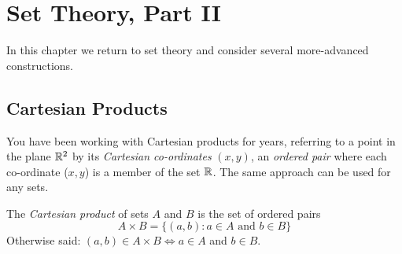 \graphicspath{{6setsii/asy/}}

\section{Set Theory, Part II}\label{chap:sets2}



In this chapter we return to set theory and consider several more-advanced constructions.

\subsection{Cartesian Products}\label{sec:cartprod}

You have been working with Cartesian products for years, referring to a point in the plane $\mathbb{R}^2$ by its \emph{Cartesian co-ordinates} $(x,y)$, an \emph{ordered pair} where each co-ordinate ($x,y$) is a member of the set $\mathbb{R}$. The same approach can be used for any sets.

\begin{defn}{}{}
	The \emph{Cartesian product} of sets $A$ and $B$ is the set of ordered pairs
	\[
		A\times B=\bigl\{(a,b):a\in A\text{ and }b\in B\bigr\}
	\]
	Otherwise said: $(a,b)\in A\times B\iff a\in A$ and $b\in B$.
\end{defn}

